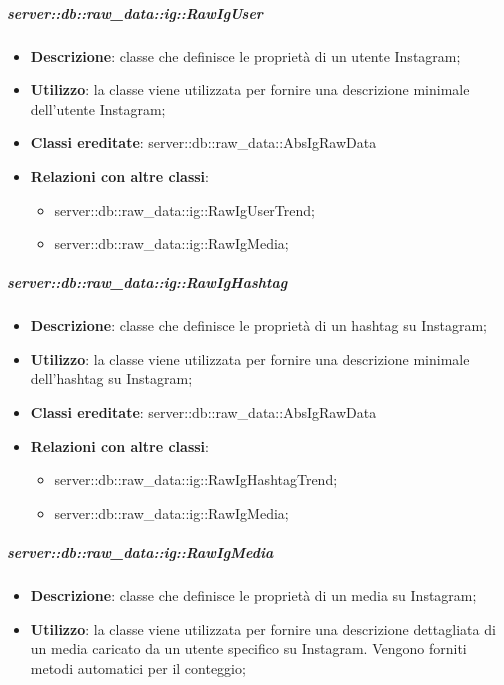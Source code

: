 		\subparagraph{server::db::raw\_data::ig::RawIgUser} %
		\label{subp:server_db_raw_data_ig_rawiguser}
			\begin{itemize}
				\item \textbf{Descrizione}: classe che definisce le proprietà di un utente Instagram;
				\item \textbf{Utilizzo}: la classe viene utilizzata per fornire una descrizione minimale dell'utente Instagram;
				\item \textbf{Classi ereditate}: server::db::raw\_data::AbsIgRawData
				\item \textbf{Relazioni con altre classi}:
					\begin{itemize}
						\item server::db::raw\_data::ig::RawIgUserTrend;
						\item server::db::raw\_data::ig::RawIgMedia;
					\end{itemize}
			\end{itemize}


		\subparagraph{server::db::raw\_data::ig::RawIgHashtag} %
		\label{subp:server_db_raw_data_ig_rawighashtag}
			\begin{itemize}
				\item \textbf{Descrizione}: classe che definisce le proprietà di un hashtag su Instagram;
				\item \textbf{Utilizzo}: la classe viene utilizzata per fornire una descrizione minimale dell'hashtag su Instagram;
				\item \textbf{Classi ereditate}: server::db::raw\_data::AbsIgRawData
				\item \textbf{Relazioni con altre classi}:
					\begin{itemize}
						\item server::db::raw\_data::ig::RawIgHashtagTrend;
						\item server::db::raw\_data::ig::RawIgMedia;
					\end{itemize}
			\end{itemize}


		\subparagraph{server::db::raw\_data::ig::RawIgMedia} %
		\label{subp:server_db_raw_data_ig_rawigmedia}
			\begin{itemize}
				\item \textbf{Descrizione}: classe che definisce le proprietà di un media su Instagram;
				\item \textbf{Utilizzo}: la classe viene utilizzata per fornire una descrizione dettagliata di un media caricato da un utente specifico su Instagram. Vengono forniti metodi automatici per il conteggio;
			\end{itemize}



